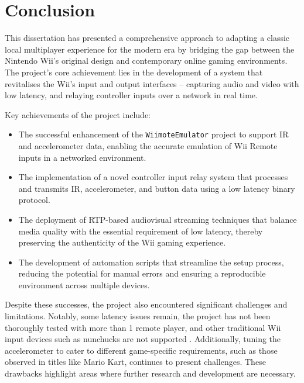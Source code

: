 \chapter{Conclusion}
\label{chapter:conclusion}

This dissertation has presented a comprehensive approach to adapting a classic local multiplayer experience for the modern era by bridging the gap between the Nintendo Wii’s original design and contemporary online gaming environments. The project’s core achievement lies in the development of a system that revitalises the Wii’s input and output interfaces -- capturing audio and video with low latency, and relaying controller inputs over a network in real time.

Key achievements of the project include:
\begin{itemize}
	\item The successful enhancement of the \texttt{WiimoteEmulator} project to support IR and accelerometer data, enabling the accurate emulation of Wii Remote inputs in a networked environment.
	\item The implementation of a novel controller input relay system that processes and transmits IR, accelerometer, and button data using a low latency binary protocol.
	\item The deployment of RTP-based audiovisual streaming techniques that balance media quality with the essential requirement of low latency, thereby preserving the authenticity of the Wii gaming experience.
	\item The development of automation scripts that streamline the setup process, reducing the potential for manual errors and ensuring a reproducible environment across multiple devices.
\end{itemize}

Despite these successes, the project also encountered significant challenges and limitations. Notably, some latency issues remain, the project has not been thoroughly tested with more than 1 remote player, and other traditional Wii input devices such as nunchucks are not supported . Additionally, tuning the accelerometer to cater to different game-specific requirements, such as those observed in titles like Mario Kart, continues to present challenges. These drawbacks highlight areas where further research and development are necessary.

